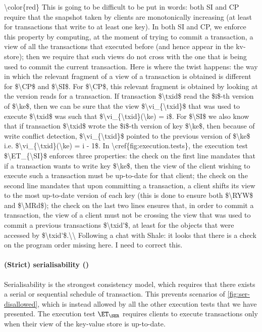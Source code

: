 \ac{\color{red} This is going to be difficult to be put in words: 
both SI and CP require that the snapshot taken by clients are monotonically 
increasing (at least for transactions that write to at least one key). 
In both SI and CP, we enforce this property by computing, at the moment 
of trying to commit a transaction, a view of all the transactions that executed before 
(and hence appear in the kv-store); then we require that such views do not cross 
with the one that is being used to commit the current transaction. Here is where 
the twist happens: the way in which the relevant fragment of a view of 
a transaction is obtained is different for $\CP$ and $\SI$. 
For $\CP$, this relevant fragment is obtained 
by looking at the version reads for a transaction. If transaction $\txid$ read the 
$i$-th version of $\ke$, then we can be sure that the view $\vi_{\txid}$ 
that was used to execute $\txid$ was such that $\vi_{\txid}(\ke) = i$. 
For $\SI$ we also know that if transaction $\txid$ wrote the $i$-th version 
of key $\ke$, then because of write conflict detection, $\vi_{\txid}$ pointed 
to the previous version of $\ke$ i.e. $\vi_{\txid}(\ke) = i - 1$. 
In \cref{fig:execution.tests}, the execution test $\ET_{\SI}$ enforces three properties: 
the check on the first line mandates that  if a transaction wants to write key $\ke$, then the view of the client wishing 
to execute such a transaction must be up-to-date for that client; the check 
on the second line mandates that upon committing 
a transaction, a client shifts its view to the most up-to-date version of each 
key (this is done to ensure both $\RYW$ and $\MRd$); 
the check on the last two lines ensures that, in order to commit a transaction, the 
view of a client must not be crossing the view that was used to commit a previous 
transactions $\txid'$, at least for the objects that were accessed by $\txid'$.\\
Following a chat with Shale: it looks that there is a check on the program order missing 
here. I need to correct this.}

\paragraph{(Strict) serialisability (\SER)}
Serialisability is the strongest consistency model, 
which requires that there exists a serial or sequential schedule of transaction. 
This prevents scenarios of \cref{fig:ser-disallowed},
which is instead allowed by all the other execution tests that we have presented.
The execution test $\ET_{\SER}$ requires 
clients to execute transactions only when their view of the key-value store is up-to-date.


